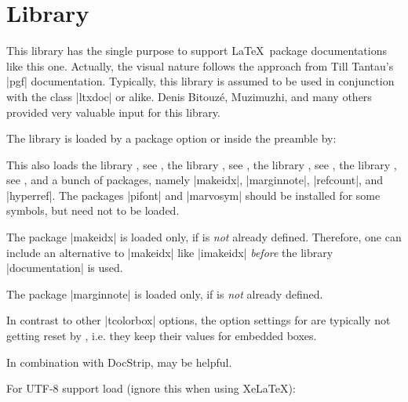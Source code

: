 \clearpage
\section{Library }\label{sec:documentation}%
%
This library has the single purpose to support \LaTeX\ package documentations
like this one. Actually, the visual nature follows the approach from
Till Tantau's |pgf| \cite{tantau:tikz_and_pgf} documentation.
Typically, this library is assumed to be used in conjunction with the
class |ltxdoc| or alike.
Denis Bitouz\'e, Muzimuzhi, and many others provided very valuable input for this library.

The library is loaded by a package option or inside the preamble by:
\begin{dispListing}
\end{dispListing}
This also loads
the library , see ,
the library , see ,
the library , see ,
the library , see ,
and a bunch of packages, namely
|makeidx|, |marginnote|, |refcount|, and |hyperref|.
The packages |pifont| and |marvosym| should be installed for some symbols, but
need not to be loaded.

\begin{marker}
The package |makeidx| is loaded only, if  is
\emph{not} already defined. Therefore, one can include an alternative to |makeidx| like
|imakeidx| \emph{before} the library |documentation| is used.
\end{marker}
\begin{marker}
The package |marginnote| is loaded only, if  is
\emph{not} already defined.
\end{marker}
\begin{marker}
In contrast to other |tcolorbox| options, the option
settings for  are typically not
getting reset by , i.e. they keep their
values for embedded boxes.
\end{marker}
\begin{marker}
In combination with DocStrip,  may be helpful.
\end{marker}

For UTF-8 support load (ignore this when using Xe\LaTeX):
\begin{dispListing}
\end{dispListing}

